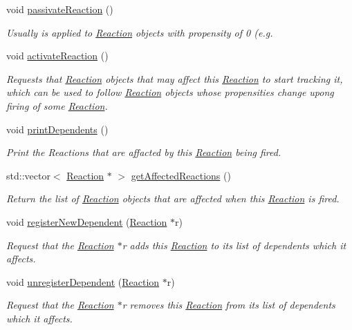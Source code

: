 \begin{DoxyCompactItemize}
void \hyperlink{classchem_1_1Reaction_a6990bf5dfc31f04bcab6bda8392174aa}{passivate\-Reaction} ()
\begin{DoxyCompactList}\small\item\em Usually is applied to \hyperlink{classchem_1_1Reaction}{Reaction} objects with propensity of 0 (e.\-g. \end{DoxyCompactList}\item 
void \hyperlink{classchem_1_1Reaction_afae5d992f176c16a21ec38fcf3d83649}{activate\-Reaction} ()
\begin{DoxyCompactList}\small\item\em Requests that \hyperlink{classchem_1_1Reaction}{Reaction} objects that may affect this \hyperlink{classchem_1_1Reaction}{Reaction} to start tracking it, which can be used to follow \hyperlink{classchem_1_1Reaction}{Reaction} objects whose propensities change upong firing of some \hyperlink{classchem_1_1Reaction}{Reaction}. \end{DoxyCompactList}\item 
void \hyperlink{classchem_1_1Reaction_af46fe664df202767dfac016253942799}{print\-Dependents} ()
\begin{DoxyCompactList}\small\item\em Print the Reactions that are affacted by this \hyperlink{classchem_1_1Reaction}{Reaction} being fired. \end{DoxyCompactList}\item 
std\-::vector$<$ \hyperlink{classchem_1_1Reaction}{Reaction} $\ast$ $>$ \hyperlink{classchem_1_1Reaction_aff0f07aebff09a5f15f2bd6d17686016}{get\-Affected\-Reactions} ()
\begin{DoxyCompactList}\small\item\em Return the list of \hyperlink{classchem_1_1Reaction}{Reaction} objects that are affected when this \hyperlink{classchem_1_1Reaction}{Reaction} is fired. \end{DoxyCompactList}\item 
void \hyperlink{classchem_1_1Reaction_a9971edbe11bb8c6b3148cbee3a449872}{register\-New\-Dependent} (\hyperlink{classchem_1_1Reaction}{Reaction} $\ast$r)
\begin{DoxyCompactList}\small\item\em Request that the \hyperlink{classchem_1_1Reaction}{Reaction} $\ast$r adds this \hyperlink{classchem_1_1Reaction}{Reaction} to its list of dependents which it affects. \end{DoxyCompactList}\item 
void \hyperlink{classchem_1_1Reaction_ab31fe2ac310f8d17b1af649bcb70e050}{unregister\-Dependent} (\hyperlink{classchem_1_1Reaction}{Reaction} $\ast$r)
\begin{DoxyCompactList}\small\item\em Request that the \hyperlink{classchem_1_1Reaction}{Reaction} $\ast$r removes this \hyperlink{classchem_1_1Reaction}{Reaction} from its list of dependents which it affects. \end{DoxyCompactList}\end{DoxyCompactItemize}
